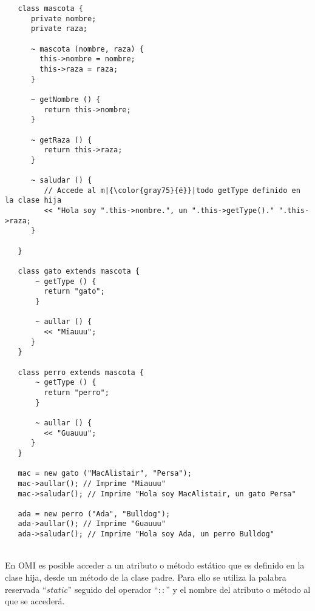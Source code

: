 \begin{lstlisting}
   class mascota {
      private nombre; 
      private raza;
      
      ~ mascota (nombre, raza) { 
        this->nombre = nombre; 
        this->raza = raza;
      }
      
      ~ getNombre () {
         return this->nombre;
      }
      
      ~ getRaza () {
         return this->raza;
      }
      
      ~ saludar () {
         // Accede al m|{\color{gray75}{é}}|todo getType definido en la clase hija
         << "Hola soy ".this->nombre.", un ".this->getType()." ".this->raza;  
      }
      
   }

   class gato extends mascota {
       ~ getType () {
         return "gato";
       }
       
       ~ aullar () { 
         << "Miauuu";
      }
   }

   class perro extends mascota {
       ~ getType () {
         return "perro";
       }
       
       ~ aullar () { 
         << "Guauuu";
      }
   }
   
   mac = new gato ("MacAlistair", "Persa"); 
   mac->aullar(); // Imprime "Miauuu"
   mac->saludar(); // Imprime "Hola soy MacAlistair, un gato Persa"
   
   ada = new perro ("Ada", "Bulldog"); 
   ada->aullar(); // Imprime "Guauuu"
   ada->saludar(); // Imprime "Hola soy Ada, un perro Bulldog"
\end{lstlisting}
\hfill\\ 

En OMI es posible acceder a un atributo o método estático que es definido en la clase hija, desde un método de
la clase padre. Para ello se utiliza la palabra reservada ``$static$'' seguido del operador ``$::$'' y el 
nombre del atributo o método al que se accederá. \\

